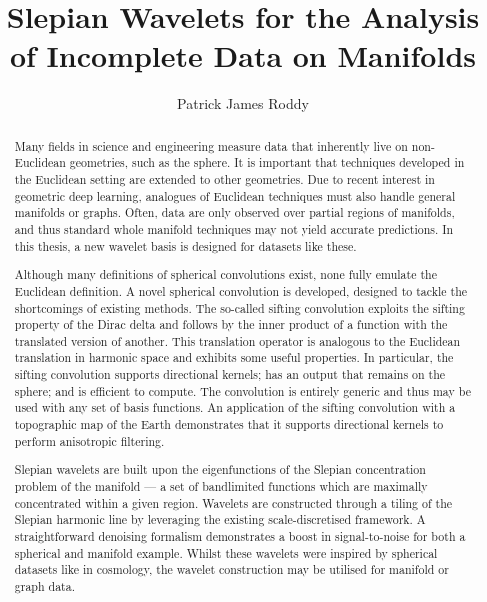 
\title{Slepian Wavelets for the Analysis of Incomplete Data on Manifolds}
\author{Patrick James Roddy}

\maketitle
\makedeclaration{}

\begin{abstract} %
	Many fields in science and engineering measure data that inherently live on non-Euclidean geometries, such as the sphere.
	It is important that techniques developed in the Euclidean setting are extended to other geometries.
	Due to recent interest in geometric deep learning, analogues of Euclidean techniques must also handle general manifolds or graphs.
	Often, data are only observed over partial regions of manifolds, and thus standard whole manifold techniques may not yield accurate predictions.
	In this thesis, a new wavelet basis is designed for datasets like these.

	Although many definitions of spherical convolutions exist, none fully emulate the Euclidean definition.
	A novel spherical convolution is developed, designed to tackle the shortcomings of existing methods.
	The so-called sifting convolution exploits the sifting property of the Dirac delta and follows by the inner product of a function with the translated version of another.
	This translation operator is analogous to the Euclidean translation in harmonic space and exhibits some useful properties.
	In particular, the sifting convolution supports directional kernels; has an output that remains on the sphere; and is efficient to compute.
	The convolution is entirely generic and thus may be used with any set of basis functions.
	An application of the sifting convolution with a topographic map of the Earth demonstrates that it supports directional kernels to perform anisotropic filtering.

	Slepian wavelets are built upon the eigenfunctions of the Slepian concentration problem of the manifold --- a set of bandlimited functions which are maximally concentrated within a given region.
	Wavelets are constructed through a tiling of the Slepian harmonic line by leveraging the existing scale-discretised framework.
	A straightforward denoising formalism demonstrates a boost in signal-to-noise for both a spherical and manifold example.
	Whilst these wavelets were inspired by spherical datasets like in cosmology, the wavelet construction may be utilised for manifold or graph data.
\end{abstract}

